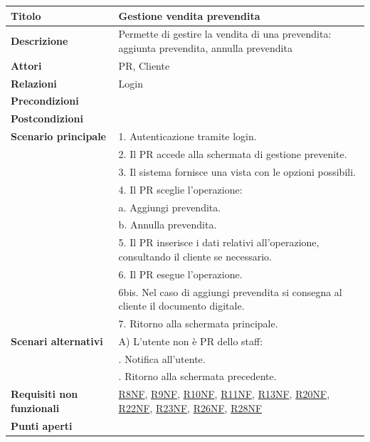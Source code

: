 \documentclass[a4paper]{article}
\begin{document}
  \begin{center}
    \begin{tabularx}{1\textwidth}{l|X}
        \textbf{Titolo} & Gestione vendita prevendita \\
        \hline
        \textbf{Descrizione} & Permette di gestire la vendita di una prevendita: aggiunta prevendita, annulla prevendita \\
        \hline
        \textbf{Attori} & PR, Cliente \\
        \hline
        \textbf{Relazioni} & Login \\
        \hline
        \textbf{Precondizioni} &  \\
        \hline
        \textbf{Postcondizioni} &  \\
        \hline
        \textbf{Scenario principale} & 1. Autenticazione tramite login. \\
                                     & 2. Il PR accede alla schermata di gestione prevenite. \\
                                     & 3. Il sistema fornisce una vista con le opzioni possibili. \\
                                     & 4. Il PR sceglie l'operazione:\\
                                     & \quad a. Aggiungi prevendita.\\
                                     & \quad b. Annulla prevendita.\\
                                     & 5. Il PR inserisce i dati relativi all'operazione, consultando il cliente se necessario.\\
                                     & 6. Il PR esegue l'operazione.\\
                                     & 6bis. Nel caso di aggiungi prevendita si consegna al cliente il documento digitale.\\
                                     & 7. Ritorno alla schermata principale.\\
        \hline
        \textbf{Scenari alternativi} & A) L'utente non è PR dello staff: \\
                                     & \quad 1. Notifica all'utente. \\
                                     & \quad 2. Ritorno alla schermata precedente. \\
        \hline
        \textbf{Requisiti non funzionali} & \hyperlink{R8NF}{R8NF}, \hyperlink{R9NF}{R9NF}, \hyperlink{R10NF}{R10NF}, \hyperlink{R11NF}{R11NF}, \hyperlink{R13NF}{R13NF}, \hyperlink{R20NF}{R20NF}, \hyperlink{R22NF}{R22NF}, \hyperlink{R23NF}{R23NF}, \hyperlink{R26NF}{R26NF}, \hyperlink{R28NF}{R28NF}   \\
        \hline
        \textbf{Punti aperti} & \\
        \hline
    \end{tabularx}
  \end{center}
\end{document}
